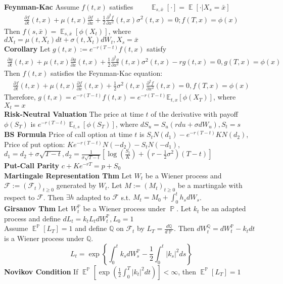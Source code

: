 \documentclass[10pt,landscape, a4paper]{article}
\theoremstyle{remark}
\newcommand{\E}{\operatorname{\mathbb{E}}}
\newcommand{\prob}{\operatorname{\mathbb{P}}}
\newcommand{\abs}[1]{\left\lvert #1 \right\rvert}
\newcommand{\F}{\mathcal{F}}
\newcommand{\Q}{\mathbb{Q}}
\begin{document}
\begin{multicols*}{3}
\textbf{Feynman-Kac} Assume $f(t, x)$ satisfies $\qquad \E_{s, \bar{x}}[\cdot] = \E [\cdot \lvert X_s = \bar{x}]$
\begin{align*}
    \frac{\partial f}{\partial t} (t, x) + \mu (t, x) \frac{\partial f}{\partial x} + \frac{1}{2} \frac{\partial^2 f}{\partial x^2} (t, x) \sigma^2 (t, x) = 0; f(T, x) = \phi(x)
\end{align*}
Then $f(s, \bar{x}) = \E_{s, \bar{x}} [\phi(X_t)]$, where $dX_t = \mu (t, X_t) dt + \sigma (t, X_t) dW_t, X_s = \bar{x}$\\
\textbf{Corollary} Let $g(t, x):= e^{-r(T-t)} f(t, x)$ satisfy
\begin{align*}
    \frac{\partial g}{\partial t}(t,x) + \mu(t,x)\frac{\partial g}{\partial x}(t,x) + \frac{1}{2}\frac{\partial^2 g}{\partial x^2}(t,x) \sigma^2(t,x) - rg(t,x) = 0, g(T, x) = \phi(x)
\end{align*}
Then $f(t, x)$ satisfies the Feynman-Kac equation:
\begin{align*}
    \frac{\partial f}{\partial t}(t,x) + \mu(t,x)\frac{\partial f}{\partial x}(t,x) + \frac{1}{2}\sigma^2(t,x)\frac{\partial^2 f}{\partial x^2} (t,x) = 0, f(T, x) = \phi(x)
\end{align*}
Therefore, $g(t, x) = e^{-r(T-t)}f(t, x) = e^{-r(T-t)}\mathbb{E}_{t,x}[\phi(X_T)]$, where $X_t = x$\\

\textbf{Risk-Neutral Valuation} The price at time $t$ of the derivative with payoff $\phi (S_T)$ is $e^{-r(T-t)} \E_{t, s} [\phi (S_T)]$, where $d S_u = S_u (rdu+ \sigma dW_u ), S_t = s$\\

\textbf{BS Formula} Price of call option at time $t$ is $S_tN(d_1 ) - e^{-r(T-t)} KN(d_2 )$, Price of put option: $Ke^{-r(T-t)} N(-d_2 ) - S_t N(-d_1)$, $d_1 = d_2 + \sigma \sqrt{T-t}, d_2 = \frac{1}{\sigma \sqrt{T-t}} \left[\log \left(\frac{S_t}{K} \right) + (r - \frac{1}{2} \sigma^2 )(T-t) \right]$\\
\textbf{Put-Call Parity} $c + Ke^{-rT} = p + S_0$\\

\textbf{Martingale Representation Thm} Let $W_t$ be a Wiener process and $\F := (\F_t)_{t\geq 0}$ generated by $W_t$. Let $M:= (M_t)_{t\geq 0}$ be a martingale with respect to $\F$. Then $\exists h$ adapted to $\F$ s.t. $M_t=M_0 + \int^t_0 h_s d W_s$.\\

\textbf{Girsanov Thm} Let $W_t^{\prob} $ be a Wiener process under $\prob $. Let $k_t$ be an adapted process and define $dL_t = k_t L_t d W^{\prob}_t, L_0 = 1$\\
Assume $\E^{\prob} [L_T] = 1$ and define $\Q$ on $\F_t$ by $L_T = \frac{d\Q}{d\prob}$. Then $dW^{\Q}_t = dW_t^{\prob} - k_t dt$ is a Wiener process under $\Q$.\\
$$L_t = \exp \left\{\int^t_0 k_s dW^{\prob}_s  - \frac{1}{2}\int^t_0\abs{k_s}^2 ds \right\}$$
\textbf{Novikov Condition} If $\E^{\prob} [\exp (\frac{1}{2} \int^T_0 \abs{k_t}^2 dt)] < \infty $, then $\E^{\prob} [L_T] = 1$\\


\end{multicols*}
\end{document}
